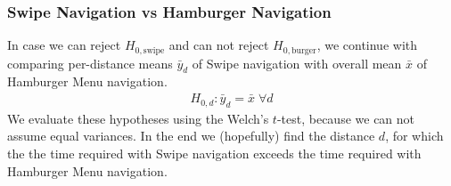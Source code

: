 \documentclass{beamer}
\begin{document}
\begin{frame}
        \frametitle{Swipe Navigation vs Hamburger Navigation}
        In case we can reject $H_{0, \text{swipe}}$ and can not reject $H_{0, \text{burger}}$,
        we continue with comparing per-distance means $\bar y_d$ of Swipe navigation
        with overall mean $\bar x$ of Hamburger Menu navigation.
        \begin{align*}
                H_{0,d} : \bar y_d = \bar x \;\forall d
        \end{align*}
        We evaluate these hypotheses using the Welch's $t$-test,
        because we can not assume equal variances.
        In the end we (hopefully) find the distance $d$,
        for which the the time required with Swipe navigation exceeds the time required with Hamburger Menu navigation.
\end{frame}
\end{document}
